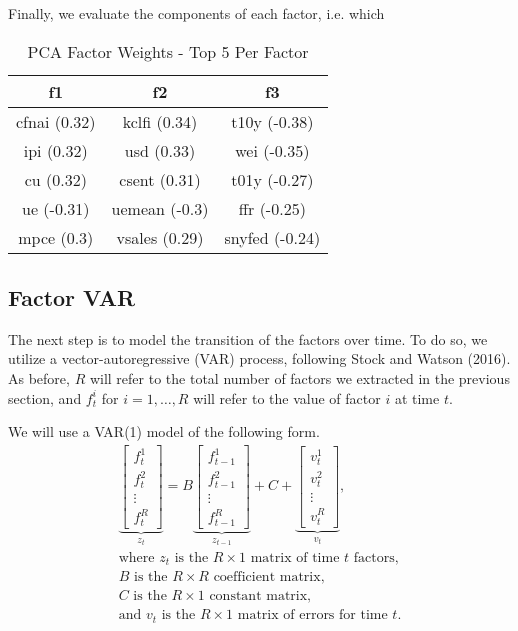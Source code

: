 \documentclass[11pt, letterpaper]{article}\usepackage[]{graphicx}\usepackage[]{color}
\begin{document}
Finally, we evaluate the components of each factor, i.e. which 
\begin{table}[H]
\centering
\begingroup\scriptsize
\begin{tabular}{ccc}
  \hline
f1 & f2 & f3 \\ 
  \hline
cfnai (0.32) & kclfi (0.34) & t10y (-0.38) \\ 
  ipi (0.32) & usd (0.33) & wei (-0.35) \\ 
  cu (0.32) & csent (0.31) & t01y (-0.27) \\ 
  ue (-0.31) & uemean (-0.3) & ffr (-0.25) \\ 
  mpce (0.3) & vsales (0.29) & snyfed (-0.24) \\ 
   \hline
\end{tabular}
\endgroup
\caption{PCA Factor Weights - Top 5 Per Factor} 
\end{table}




\subsection{Factor VAR}
The next step is to model the transition of the factors over time. To do so, we utilize a vector-autoregressive (VAR) process, following Stock and Watson (2016). As before, $R$ will refer to the total number of factors we extracted in the previous section, and $f^i_t$ for $i = 1, \dots, R$ will refer to the value of factor $i$ at time $t$.

We will use a VAR(1) model of the following form.
\begin{align*}
\underbrace{\begin{bmatrix}
	f^1_{t}\\
	f^2_{t}\\
	\vdots \\
	f^R_{t}
\end{bmatrix}}_{z_t}
=
B
\underbrace{\begin{bmatrix}
	f^1_{t-1}\\
	f^2_{t-1}\\
	\vdots \\
	f^R_{t-1}
\end{bmatrix}}_{z_{t-1}}
+
C
+
\underbrace{\begin{bmatrix}
v^1_t\\
v^2_t\\
\vdots\\
v^R_t
\end{bmatrix}}_{v_t},\\
\text{where $z_t$ is the $R \times 1$ matrix of time $t$ factors,}\\
\text{$B$ is the $R \times R$ coefficient matrix,}\\
\text{$C$ is the $R \times 1$ constant matrix,}\\
\text{and $v_t$ is the $R \times 1$ matrix of errors for time $t$.}
\end{align*}
\end{document}
